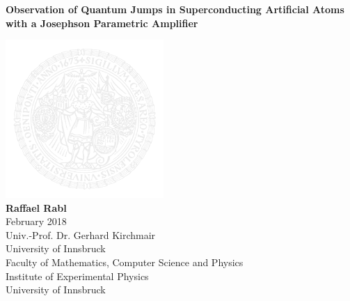 \documentclass[twoside]{extarticle}
\begin{document}
\begin{titlepage}
\begin{center}
\vspace*{2cm}
%

\begin{title}
\textbf{\textsf{\Huge Observation of Quantum Jumps in Superconducting Artificial Atoms with a Josephson Parametric Amplifier}}\\
\end{title}

\vspace*{0.5cm}
\includegraphics[width=6cm]{chapters/Introduction/figures/LogoGrau.png}
\vspace*{0.5cm}\\

%
\large {\textbf{Raffael Rabl}}\\
\large {February 2018}\\
\singlespacing
\vspace{4cm}
\large {Univ.-Prof. Dr. Gerhard Kirchmair}\\
University of Innsbruck\\
%
\vspace{1.0cm}
\large Faculty of Mathematics, Computer Science and Physics\\
\large Institute of Experimental Physics\\
\large University of Innsbruck

\end{center}
\end{titlepage}






\end{document}

